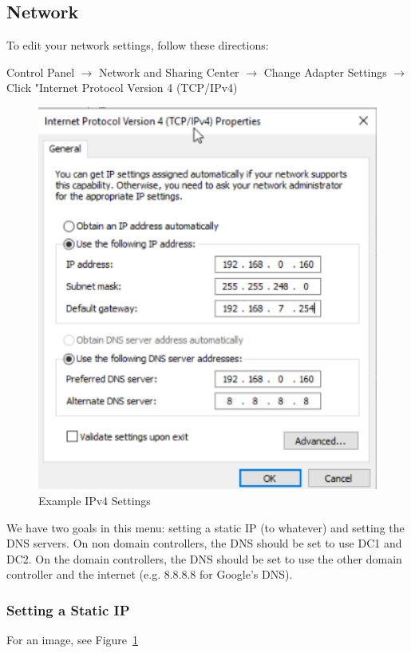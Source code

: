 \documentclass{article}
\begin{document}
\subsection{Network}
To edit your network settings, follow these directions:

Control Panel $\rightarrow$ Network and Sharing Center $\rightarrow$
Change Adapter Settings $\rightarrow$ Click "Internet Protocol Version 4 (TCP/IPv4)

\begin{figure}[]
        \centering
        \includegraphics[width=1\textwidth]{SampleDCIPv4.png}
        \caption{Example IPv4 Settings}
        \label{fig:IPv4Settings}
\end{figure}

We have two goals in this menu: setting a static IP (to whatever) and setting the DNS servers. 
On non domain controllers, the DNS should be set to use DC1 and DC2.
On the domain controllers, the DNS should be set to use the other domain controller and the internet (e.g. 8.8.8.8 for Google's DNS).

\subsubsection{Setting a Static IP}
For an image, see Figure~\ref{fig:IPv4Settings}
\end{document}
